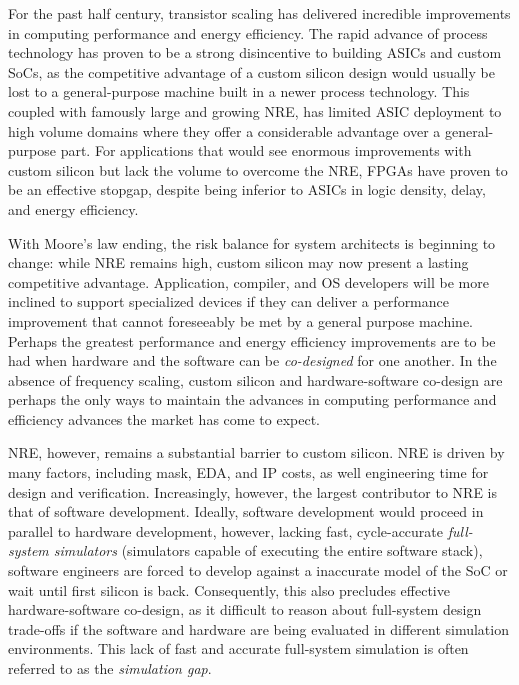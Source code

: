 For the past half century, transistor scaling has delivered incredible
improvements in computing performance and energy efficiency. The rapid advance
of process technology has proven to be a strong disincentive to building ASICs and custom SoCs, 
as the competitive advantage of a custom silicon design would usually be lost
to a general-purpose machine built in a newer process technology. This coupled
with famously large and growing NRE, has limited ASIC deployment to high volume
domains where they offer a considerable advantage over a general-purpose part.
For applications that would see enormous improvements with custom silicon but
lack the volume to overcome the NRE, FPGAs have proven to be an effective
stopgap, despite being inferior to ASICs in logic density, delay, and energy
efficiency.

With Moore’s law ending, the risk balance for system architects is beginning to
change: while NRE remains high, custom silicon may now present a lasting
competitive advantage.  Application, compiler, and OS developers will be more
inclined to support specialized devices if they can deliver a performance
improvement that cannot foreseeably be met by a general purpose machine.
Perhaps the greatest performance and energy efficiency improvements are to be
had when hardware and the software can be \emph{co-designed} for one another.
In the absence of frequency scaling, custom silicon and hardware-software
co-design are perhaps the only ways to maintain the advances in computing
performance and efficiency advances the market has come to expect.

NRE, however, remains a substantial barrier to  custom silicon.
NRE is driven by many factors, including mask, EDA, and IP costs, as well
engineering time for design and verification. Increasingly, however, the
largest contributor to NRE is that of software development.  Ideally, software
development would proceed in parallel to hardware development, however, lacking
fast, cycle-accurate \emph{full-system simulators} (simulators capable of
executing the entire software stack), software engineers are forced to develop
against a inaccurate model of the SoC or wait until first silicon is back.
Consequently, this also precludes effective hardware-software co-design, as it
difficult to reason about full-system design trade-offs if the software and
hardware are being evaluated in different simulation environments. This lack of
fast and accurate full-system simulation is often referred to as the
\emph{simulation gap}.

